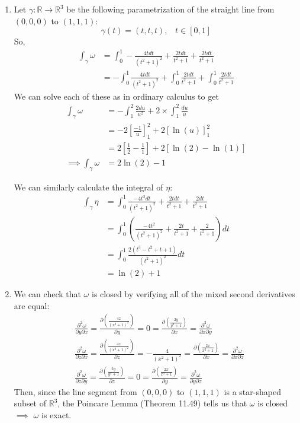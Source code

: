 \documentclass{article}
\newcommand{\R}{\mathbb{R}}
\begin{document}
\begin{enumerate}[label=(\alph*)]
  \item Let $\gamma : \R \rightarrow \R^3$ be the following parametrization of the straight line from $(0,0,0)$ to $(1,1,1)$:
  \[ \gamma(t) = (t,t,t), \;\;\; t \in [0, 1] \]
  So, 
  \begin{align*}
    \int_{\gamma} \omega &= \int_{0}^{1} -\frac{4tdt}{(t^2+1)^2} + \frac{2tdt}{t^2 + 1} + \frac{2tdt}{t^2 + 1} \\
    &= -\int_{0}^{1} \frac{4tdt}{(t^2+1)^2} + \int_{0}^{1} \frac{2tdt}{t^2 + 1} + \int_{0}^{1} \frac{2tdt}{t^2 + 1} 
  \end{align*}
  We can solve each of these as in ordinary calculus to get 
  \begin{align*}
    \int_{\gamma} \omega &= -\int_{1}^{2} \frac{2 du}{u^2} + 2 \times \int_{1}^{2} \frac{du}{u} \\
    &= -2\left[\frac{-1}{u}\right]_1^2 + 2 \left[\ln(u)\right]_1^2 \\
    &= 2 \left[\frac{1}{2} - \frac{1}{1}\right] + 2\left[ \ln(2) - \ln(1) \right] \\
    \implies \int_{\gamma} \omega &= 2\ln(2) - 1
  \end{align*}

  We can similarly calculate the integral of $\eta$:
  \vskip 0.5cm
  \begin{align*}
    \int_{\gamma} \eta &= \int_{0}^{1} \frac{-4t^2dt}{(t^2+1)^2} + \frac{2tdt}{t^2 + 1} + \frac{2dt}{t^2 + 1} \\
    &= \int_{0}^{1} \left(\frac{-4t^2}{(t^2+1)^2} + \frac{2t}{t^2 + 1} + \frac{2}{t^2 + 1} \right) dt\\
    &= \int_{0}^{1} \frac{2\left(t^3 - t^2 + t + 1\right)}{(t^2 + 1)^2} dt \\
    &= \ln(2) + 1
  \end{align*}

  \vskip 0.5cm
  \item We can check that $\omega$ is closed by verifying all of the mixed second derivatives are equal:
  \begin{align*}
    &\frac{\partial^2 \omega}{\partial y \partial x} = \frac{\partial \left( \frac{4z}{(x^2 + 1)^2} \right)}{\partial y} = 0 = \frac{\partial \left(\frac{2y}{y^2 + 1}\right)}{\partial x} = \frac{\partial^2 \omega}{\partial x \partial y} \\
    &\frac{\partial^2 \omega}{\partial z \partial x} = \frac{\partial \left( \frac{4z}{(x^2 + 1)^2} \right)}{\partial z} = -\frac{4}{(x^2 + 1)^2} = \frac{\partial \left(\frac{2x}{x^2 + 1}\right)}{\partial x} = \frac{\partial^2 \omega}{\partial x \partial z} \\
    &\frac{\partial^2 \omega}{\partial z \partial y} = \frac{\partial \left( \frac{2y}{y^2 + 1} \right)}{\partial z} = 0 = \frac{\partial \left(\frac{2x}{x^2 + 1}\right)}{\partial y} = \frac{\partial^2 \omega}{\partial y \partial z} 
  \end{align*}
  Then, since the line segment from $(0,0,0)$ to $(1,1,1)$ is a star-shaped subset of $\R^3$, the Poincare Lemma (Theorem 11.49) tells us that $\omega$ is closed $\implies$ $\omega$ is exact.


\end{enumerate}
\end{document}
